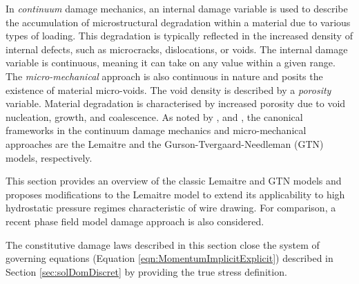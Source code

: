\documentclass[sn-mathphys,Numbered]{sn-jnl}%
\begin{document}
In \emph{continuum} damage mechanics, an internal damage variable is used to describe the accumulation of microstructural degradation within a material due to various types of loading.
This degradation is typically reflected in the increased density of internal defects, such as microcracks, dislocations, or voids.
The internal damage variable is continuous, meaning it can take on any value within a given range.
The \emph{micro-mechanical} approach is also continuous in nature and posits the existence of material micro-voids.
The void density is described by a \emph{porosity} variable.
Material degradation is characterised by increased porosity due to void nucleation, growth, and coalescence.
As noted by \citet{besson_continuum_2010}, \citet{cao_models_2017} and \citet{tekkaya_damage_2020}, the canonical frameworks in the continuum damage mechanics and micro-mechanical approaches are the Lemaitre \cite{lemaitre_continuous_1985,lemaitre_engineering_2005} and the Gurson-Tvergaard-Needleman (GTN) \cite{gurson_continuum_1977,tvergaard_analysis_1984} models, respectively.

This section provides an overview of the classic Lemaitre and GTN models and proposes modifications to the Lemaitre model to extend its applicability to high hydrostatic pressure regimes characteristic of wire drawing.
For comparison, a recent phase field model damage approach is also considered.

The constitutive damage laws described in this section close the system of governing equations (Equation \ref{eqn:MomentumImplicitExplicit}) described in Section \ref{sec:solDomDiscret} by providing the true stress definition.


%
\end{document}

